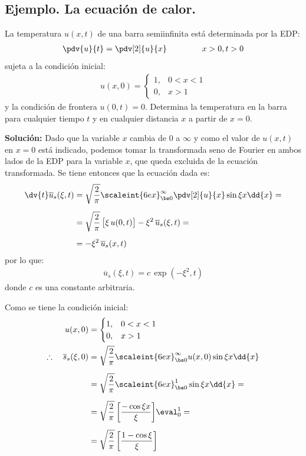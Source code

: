 \subsection*{Ejemplo. La ecuación de calor.}

La temperatura $u(x, t)$ de una barra semiinfinita está determinada por la EDP:
\begin{align*}
\pdv{u}{t} = \pdv[2]{u}{x} \hspace{1.5cm} x > 0, t > 0
\end{align*}
sujeta a la condición inicial:
\begin{align*}
u(x, 0) = \begin{cases}
1, & 0 < x < 1  \\
0, & x > 1
\end{cases}
\end{align*}
y la condición de frontera $u(0, t) = 0$. Determina la temperatura en la barra para cualquier tiempo $t$ y en cualquier distancia $x$ a partir de $x = 0$.
\par
\noindent
\textbf{Solución: } Dado que la variable $x$ cambia de $0$ a $\infty$ y como el valor de $u(x, t)$ en $x = 0$ está indicado, podemos tomar la transformada seno de Fourier en ambos lados de la EDP para la variable $x$, que queda excluida de la ecuación transformada. Se tiene entonces que la ecuación dada es:
\begin{align*}
\dv{t} \overline{u}_{s} (\xi, t) &= \sqrt{\dfrac{2}{\pi}} \scaleint{6ex}_{\bs 0}^{\infty} \pdv[2]{u}{x} \sin \xi x \dd{x} = \\[0.5em]
&= \sqrt{\dfrac{2}{\pi}} \, \big[ \xi \, u(0, t) \big] - \xi^{2} \, \overline{u}_{s} (\xi, t) = \\[0.5em]
&= - \xi^{2} \, \overline{u}_{s} (x , t)
\end{align*}
por lo que:
\begin{align}
\overline{u}_{s} (\xi, t) = c \, \exp(-\xi^{2}, t)
\label{eq:ecuacion_ejemplo_1_27_i}
\end{align}
donde $c$ es una constante arbitraria.
\par
Como se tiene la condición inicial:
\begin{align}
\begin{aligned}
u(x, 0) &= \begin{cases}
1, & 0 < x < 1  \\
0, & x > 1
\end{cases}
\\
\therefore \quad \overline{s}_{s} (\xi, 0) &= \sqrt{\dfrac{2}{\pi}} \scaleint{6ex}_{\bs 0}^{\infty} u(x, 0) \sin \xi x \dd{x} \\[0.5em]
&= \sqrt{\dfrac{2}{\pi}} \scaleint{6ex}_{\bs 0}^{1} \sin \xi x \dd{x} = \\[0.5em]
&= \sqrt{\dfrac{2}{\pi}} \, \bigg[ \dfrac{- \cos \xi x}{\xi} \bigg] \eval_{0}^{1} = \\[0.5em]
&= \sqrt{\dfrac{2}{\pi}} \, \bigg[ \dfrac{1 - \cos \xi}{\xi} \bigg]
\end{aligned}
\label{eq:ecuacion_ejemplo_1_27_ii}
\end{align}
